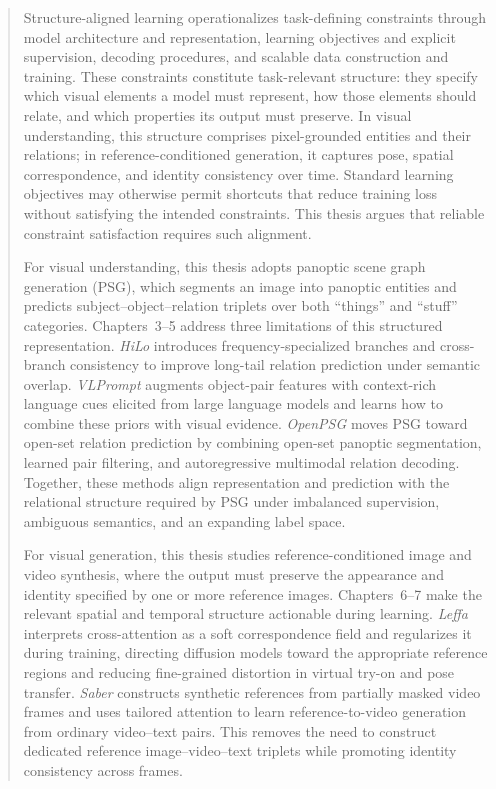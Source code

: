 \begin{abstract}
Structure-aligned learning operationalizes task-defining constraints through model architecture and representation, learning objectives and explicit supervision, decoding procedures, and scalable data construction and training. These constraints constitute task-relevant structure: they specify which visual elements a model must represent, how those elements should relate, and which properties its output must preserve. In visual understanding, this structure comprises pixel-grounded entities and their relations; in reference-conditioned generation, it captures pose, spatial correspondence, and identity consistency over time. Standard learning objectives may otherwise permit shortcuts that reduce training loss without satisfying the intended constraints. This thesis argues that reliable constraint satisfaction requires such alignment.

For visual understanding, this thesis adopts panoptic scene graph generation (PSG), which segments an image into panoptic entities and predicts subject--object--relation triplets over both ``things'' and ``stuff'' categories. Chapters~3--5 address three limitations of this structured representation. \emph{HiLo} introduces frequency-specialized branches and cross-branch consistency to improve long-tail relation prediction under semantic overlap. \emph{VLPrompt} augments object-pair features with context-rich language cues elicited from large language models and learns how to combine these priors with visual evidence. \emph{OpenPSG} moves PSG toward open-set relation prediction by combining open-set panoptic segmentation, learned pair filtering, and autoregressive multimodal relation decoding. Together, these methods align representation and prediction with the relational structure required by PSG under imbalanced supervision, ambiguous semantics, and an expanding label space.

For visual generation, this thesis studies reference-conditioned image and video synthesis, where the output must preserve the appearance and identity specified by one or more reference images. Chapters~6--7 make the relevant spatial and temporal structure actionable during learning. \emph{Leffa} interprets cross-attention as a soft correspondence field and regularizes it during training, directing diffusion models toward the appropriate reference regions and reducing fine-grained distortion in virtual try-on and pose transfer. \emph{Saber} constructs synthetic references from partially masked video frames and uses tailored attention to learn reference-to-video generation from ordinary video--text pairs. This removes the need to construct dedicated reference image--video--text triplets while promoting identity consistency across frames.


\end{abstract}
